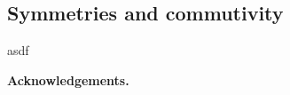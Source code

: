 \documentclass[11pt]{amsart}
\begin{document}
\subsection{Symmetries and commutivity}\label{sec:Symmetries_Commute}
asdf



\medskip

{\bf Acknowledgements.}


\medskip



\end{document}
